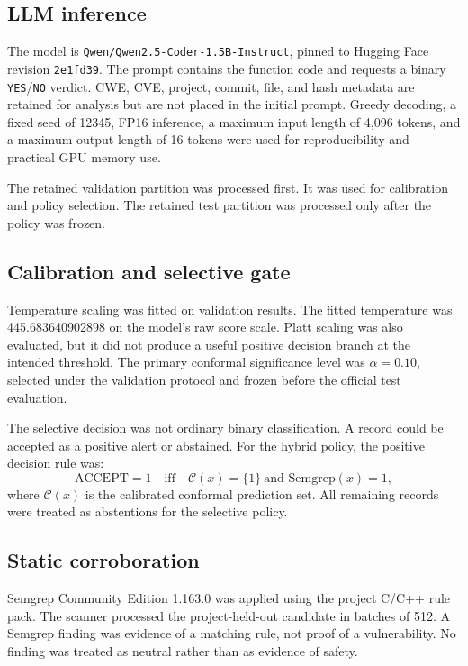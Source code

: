 \documentclass[pdflatex,sn-mathphys-num]{sn-jnl}
\begin{document}
\subsection{LLM inference}

The model is \texttt{Qwen/Qwen2.5-Coder-1.5B-Instruct}, pinned to Hugging Face revision \texttt{2e1fd39}. The prompt contains the function code and requests a binary \texttt{YES}/\texttt{NO} verdict. CWE, CVE, project, commit, file, and hash metadata are retained for analysis but are not placed in the initial prompt. Greedy decoding, a fixed seed of 12345, FP16 inference, a maximum input length of 4,096 tokens, and a maximum output length of 16 tokens were used for reproducibility and practical GPU memory use.

The retained validation partition was processed first. It was used for calibration and policy selection. The retained test partition was processed only after the policy was frozen.

\subsection{Calibration and selective gate}

Temperature scaling was fitted on validation results. The fitted temperature was 445.683640902898 on the model's raw score scale. Platt scaling was also evaluated, but it did not produce a useful positive decision branch at the intended threshold. The primary conformal significance level was $\alpha=0.10$, selected under the validation protocol and frozen before the official test evaluation.

The selective decision was not ordinary binary classification. A record could be accepted as a positive alert or abstained. For the hybrid policy, the positive decision rule was:
\begin{equation}
\text{ACCEPT}=1 \quad \text{iff} \quad \mathcal{C}(x)=\{1\}\ \text{and Semgrep}(x)=1,
\label{eq:gate}
\end{equation}
where $\mathcal{C}(x)$ is the calibrated conformal prediction set. All remaining records were treated as abstentions for the selective policy.

\subsection{Static corroboration}

Semgrep Community Edition 1.163.0 was applied using the project C/C++ rule pack. The scanner processed the project-held-out candidate in batches of 512. A Semgrep finding was evidence of a matching rule, not proof of a vulnerability. No finding was treated as neutral rather than as evidence of safety.
\end{document}
